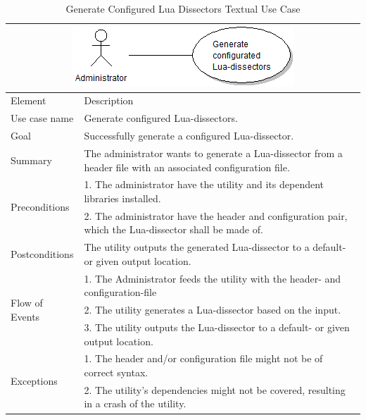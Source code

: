 \begin{table}[htbp] \footnotesize \center
\caption{Generate Configured Lua Dissectors Textual Use Case\label{tab:textual:generateconfiglua}}
\begin{tabularx}{\textwidth}{l X}
	\multicolumn{2}{c}{\includegraphics[scale=0.8]{./planning/img/uc_generateconfiglua}} \\
	\toprule
	Element & Description\\
	\midrule
	Use case name & Generate configured Lua-dissectors.\\
	Goal & Successfully generate a configured Lua-dissector. \\
	Summary & The administrator wants to generate a Lua-dissector from a header file with an associated configuration file. \\
	\multirow{2}{*}{Preconditions} & 1. The administrator have the utility and its dependent libraries installed.  \\
	& 2. The administrator have the header and configuration pair, which the Lua-dissector shall be made of. \\
	Postconditions & The utility outputs the generated Lua-dissector to a default- or given output location.\\
	\midrule
	\multirow{3}{*}{Flow of Events} & 1. The Administrator feeds the utility with the header- and configuration-file\\
	& 2. The utility generates a Lua-dissector based on the input. \\
	& 3. The utility outputs the Lua-dissector to a default- or given output location.\\
	\midrule
	\multirow{2}{*}{Exceptions} & 1. The header and/or configuration file might not be of correct syntax.\\
	& 2. The utility's dependencies might not be covered, resulting in a crash of the utility.\\
	\bottomrule
\end{tabularx}
\end{table}

